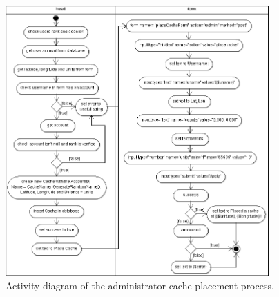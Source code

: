\begin{figure}
    \centering
    \includegraphics[width=0.9\textwidth]{images/activity/admin-placecache}
    \caption{Activity diagram of the administrator cache placement process.}
\end{figure}
